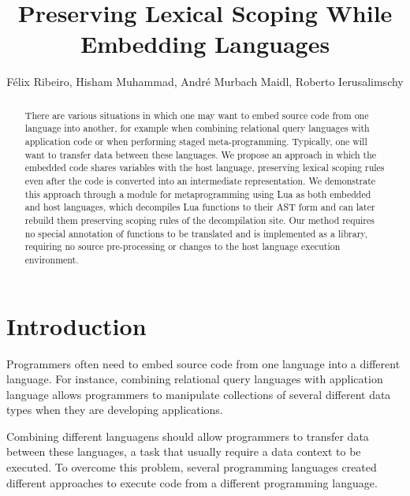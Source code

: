 \documentclass[english]{llncs}
\title{Preserving Lexical Scoping While Embedding Languages}
\author{
Félix Ribeiro,
Hisham Muhammad,
André Murbach Maidl,
Roberto Ierusalimschy
}
\institute{
Department of Computer Science --
PUC-Rio -- Rio de Janeiro -- Brazil
\email{\{fribeiro,hisham,amaidl,roberto\}@inf.puc-rio.br}
}
\begin{document}
\maketitle

\begin{abstract}

There are various situations in which one may want to embed source code from
one language into another, for example when combining relational query
languages with application code or when performing staged meta-programming.
Typically, one will want to transfer data between these languages.
We propose an approach in which the embedded code shares variables with the
host language, preserving lexical scoping rules even after the code is
converted into an intermediate representation. We demonstrate this approach
through a module for metaprogramming using Lua as both embedded and host
languages, which decompiles Lua functions to their AST form and can later
rebuild them preserving scoping rules of the decompilation site. Our method
requires no special annotation of functions to be translated and is
implemented as a library, requiring no source pre-processing or changes to
the host language execution environment.

\end{abstract}

\section{Introduction}

Programmers often need to embed source code from one language into a
different language.
For instance, combining relational query languages with application
language allows programmers to manipulate collections of several
different data types when they are developing applications.

Combining different languagens should allow programmers to transfer data
between these languages, a task that usually require a data context to
be executed.
To overcome this problem, several programming languages created different
approaches to execute code from a different programming language.

\end{document}
